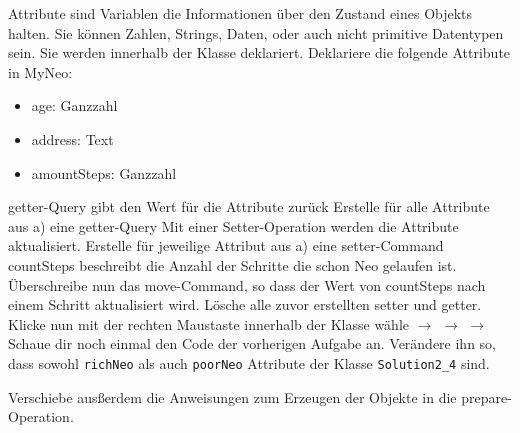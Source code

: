     Attribute sind Variablen die Informationen über den Zustand eines Objekts halten. Sie können Zahlen, Strings, Daten, oder auch nicht primitive Datentypen sein. Sie werden innerhalb der Klasse deklariert.
    \subexcercise Deklariere die folgende Attribute in MyNeo:
    \begin{itemize}
    \item age: Ganzzahl
    \item address: Text
    \item amountSteps: Ganzzahl
    \end{itemize}
    \subexcercise getter-Query gibt den Wert für die Attribute zurück
    \newline Erstelle für alle Attribute aus a) eine getter-Query
    \subexcercise Mit einer Setter-Operation werden die Attribute aktualisiert.
    Erstelle für jeweilige Attribut aus a) eine setter-Command
    \subexcercise countSteps beschreibt die Anzahl der Schritte die schon Neo gelaufen ist. Überschreibe nun das move-Command, so dass der Wert von     countSteps nach einem Schritt aktualisiert wird.
    \subexcercise Lösche alle zuvor erstellten setter und getter. Klicke nun mit der rechten Maustaste innerhalb der Klasse wähle  $\to$  $\to$  $\to$ 
    \subexcercise Schaue dir noch einmal den Code der vorherigen Aufgabe an.
    Verändere ihn so, dass sowohl \lstinline{richNeo} als auch \lstinline{poorNeo} Attribute der Klasse \lstinline{Solution2_4} sind.

    Verschiebe ausßerdem die Anweisungen zum Erzeugen der Objekte in die prepare-Operation.
